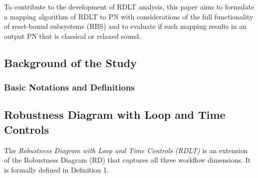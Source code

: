 To contribute to the development of RDLT analysis, this paper aims to formulate a mapping algorithm of RDLT to PN with considerations of the full functionality of reset-bound subsystems (RBS) and to evaluate if such mapping results in an output PN that is classical or relaxed sound.
    
    \subsection{Background of the Study}
        \subsubsection{Basic Notations and Definitions}
        \subsection*{Robustness Diagram with Loop and Time Controls}
        The \textit{Robustness Diagram with Loop and Time Controls (RDLT)} is an extension of the Robustness Diagram (RD) that captures all three workflow dimensions. It is formally defined in Definition 1.

        \newtheorem{definition}{Definition}

